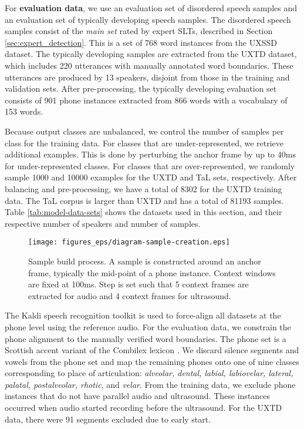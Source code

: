 For \textbf{evaluation data}, we use an evaluation set of disordered speech samples and an evaluation set of typically developing speech samples.
The disordered speech samples consist of the \emph{main set} rated by expert SLTs, described in Section \ref{sec:expert_detection}.
This is a set of 768 word instances from the UXSSD dataset.
The typically developing samples are extracted from the UXTD dataset, which includes 220 utterances with manually annotated word boundaries.
These utterances are produced by 13 speakers, disjoint from those in the training and validation sets.
After pre-processing, the typically developing evaluation set consists of 901 phone instances extracted from 866 words with a vocabulary of 153 words.

Because output classes are unbalanced, we control the number of samples per class for the training data.
For classes that are under-represented, we retrieve additional examples.
This is done by perturbing the anchor frame by up to 40ms for under-represented classes.
For classes that are over-represented, we randomly sample 1000 and 10000 examples for the UXTD and TaL sets, respectively.
After balancing and pre-processing, we have a total of 8302 for the UXTD training data.
The TaL corpus is larger than UXTD and has a total of 81193 samples.
Table \ref{tab:model-data-sets} shows the datasets used in this section, and their respective number of speakers and number of samples.

\begin{figure}
\texttt{[image: figures\_eps/diagram-sample-creation.eps]}
\caption{\label{fig:diagram-sample-build} Sample build process. A sample is constructed around an anchor frame, typically the mid-point of a phone instance. Context windows are fixed at 100ms. Step is set such that 5 context frames are extracted for audio and 4 context frames for ultrasound.}
\end{figure}

The Kaldi speech recognition toolkit \citep{povey2011kaldi} is used to force-align all datasets at the phone level using the reference audio.
For the evaluation data, we constrain the phone alignment to the manually verified word boundaries.
The phone set is a Scottish accent variant of the Combilex lexicon \citep{richmond2009robust, richmond2010generating}.
We discard silence segments and vowels from the phone set and map the remaining phones onto one of nine classes corresponding to place of articulation:
\emph{alveolar, dental, labial, labiovelar, lateral, palatal, postalveolar, rhotic}, and \emph{velar}.
From the training data, we exclude phone instances that do not have parallel audio and ultrasound.
These instances occurred when audio started recording before the ultrasound.
For the UXTD data, there were 91 segments excluded due to early start.

